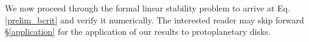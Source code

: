 \documentclass[iop]{emulateapj}
\begin{document}
We now proceed through the formal linear stability problem to arrive
at Eq. \ref{prelim_bcrit} and verify it numerically. The interested 
reader may skip forward \S\ref{application} for the application of our
results to protoplanetary disks.     





 


\appendix




\end{document}
